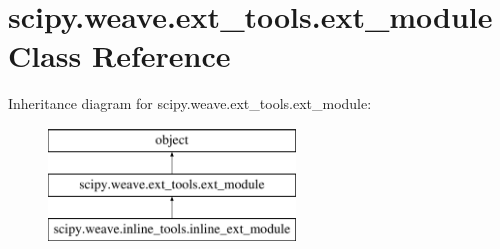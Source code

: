 \hypertarget{classscipy_1_1weave_1_1ext__tools_1_1ext__module}{}\section{scipy.\+weave.\+ext\+\_\+tools.\+ext\+\_\+module Class Reference}
\label{classscipy_1_1weave_1_1ext__tools_1_1ext__module}
Inheritance diagram for scipy.\+weave.\+ext\+\_\+tools.\+ext\+\_\+module\+:\begin{figure}[H]
\begin{center}
\leavevmode
\includegraphics[height=3.000000cm]{classscipy_1_1weave_1_1ext__tools_1_1ext__module}
\end{center}
\end{figure}
